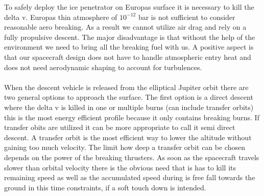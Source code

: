 
To safely deploy the ice penetrator on Europas surface it is necessary to kill the delta v. Europas thin atmosphere of \begin{math}10^{-{12}}\end{math} bar is not sufficient to consider reasonable aero breaking. As a result we cannot utilize air drag and rely on a fully propulsive descent. The major disadvantage is that without the help of the environment we need to bring all the breaking fuel with us. A positive aspect is that our spacecraft design does not have to handle atmospheric entry heat and does not need aerodynamic shaping to account for turbulences.\\
\\
When the descent vehicle is released from the elliptical Jupiter orbit there are two general options to approach the surface. The first option is a direct descent where the delta v is killed in one or multiple burns (can include transfer orbits)  this is the most energy efficient profile because it only contains breaking burns. If transfer obits are utilized it can be more appropriate to call it semi direct descent. A transfer orbit is the most efficient way to lower the altitude without gaining too much velocity. The limit how deep a transfer orbit can be chosen depends on the power of the breaking thrusters. As soon as the spacecraft travels slower than orbital velocity there is the obvious need that is has to kill its remaining speed as well as the accumulated speed during is free fall towards the ground in this time constraints, if a soft touch down is intended. \\
